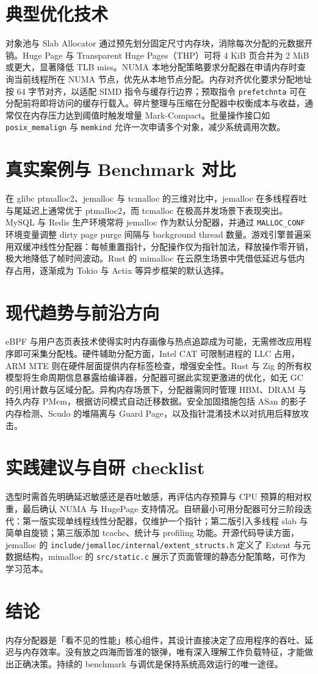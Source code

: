 \chapter{典型优化技术}
对象池与 Slab Allocator 通过预先划分固定尺寸内存块，消除每次分配的元数据开销。Huge Page 与 Transparent Huge Pages（THP）可将 4 KiB 页合并为 2 MiB 或更大，显著降低 TLB miss。NUMA 本地分配策略要求分配器在申请内存时查询当前线程所在 NUMA 节点，优先从本地节点分配。内存对齐优化要求分配地址按 64 字节对齐，以适配 SIMD 指令与缓存行边界；预取指令 \texttt{prefetchnta} 可在分配前将即将访问的缓存行载入。碎片整理与压缩在分配器中权衡成本与收益，通常仅在内存压力达到阈值时触发增量 Mark-Compact。批量操作接口如 \texttt{posix\_{}memalign} 与 \texttt{memkind} 允许一次申请多个对象，减少系统调用次数。\par
\chapter{真实案例与 Benchmark 对比}
在 glibc ptmalloc2、jemalloc 与 tcmalloc 的三维对比中，jemalloc 在多线程吞吐与尾延迟上通常优于 ptmalloc2，而 tcmalloc 在极高并发场景下表现突出。MySQL 与 Redis 生产环境常将 jemalloc 作为默认分配器，并通过 \texttt{MALLOC\_{}CONF} 环境变量调整 dirty page purge 间隔与 background thread 数量。游戏引擎普遍采用双缓冲线性分配器：每帧重置指针，分配操作仅为指针加法，释放操作零开销，极大地降低了帧时间波动。Rust 的 mimalloc 在云原生场景中凭借低延迟与低内存占用，逐渐成为 Tokio 与 Actix 等异步框架的默认选择。\par
\chapter{现代趋势与前沿方向}
eBPF 与用户态页表技术使得实时内存画像与热点追踪成为可能，无需修改应用程序即可采集分配栈。硬件辅助分配方面，Intel CAT 可限制进程的 LLC 占用，ARM MTE 则在硬件层面提供内存标签检查，增强安全性。Rust 与 Zig 的所有权模型将生命周期信息暴露给编译器，分配器可据此实现更激进的优化，如无 GC 的引用计数与区域分配。异构内存场景下，分配器需同时管理 HBM、DRAM 与持久内存 PMem，根据访问模式自动迁移数据。安全加固措施包括 ASan 的影子内存检测、Scudo 的堆隔离与 Guard Page，以及指针混淆技术以对抗用后释放攻击。\par
\chapter{实践建议与自研 checklist}
选型时需首先明确延迟敏感还是吞吐敏感，再评估内存预算与 CPU 预算的相对权重，最后确认 NUMA 与 HugePage 支持情况。自研最小可用分配器可分三阶段迭代：第一版实现单线程线性分配器，仅维护一个指针；第二版引入多线程 slab 与简单自旋锁；第三版添加 tcache、统计与 profiling 功能。开源代码导读方面，jemalloc 的 \texttt{include/jemalloc/internal/extent\_{}structs.h} 定义了 Extent 与元数据结构，mimalloc 的 \texttt{src/static.c} 展示了页面管理的静态分配策略，可作为学习范本。\par
\chapter{结论}
内存分配器是「看不见的性能」核心组件，其设计直接决定了应用程序的吞吐、延迟与内存效率。没有放之四海而皆准的银弹，唯有深入理解工作负载特征，才能做出正确决策。持续的 benchmark 与调优是保持系统高效运行的唯一途径。\par
